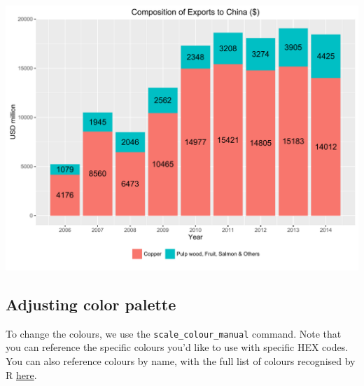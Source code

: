 \documentclass[]{article}
\newenvironment{Shaded}{\begin{snugshade}}{\end{snugshade}}
\newcommand{\KeywordTok}[1]{\textcolor[rgb]{0.13,0.29,0.53}{\textbf{{#1}}}}
\newcommand{\DataTypeTok}[1]{\textcolor[rgb]{0.13,0.29,0.53}{{#1}}}
\newcommand{\StringTok}[1]{\textcolor[rgb]{0.31,0.60,0.02}{{#1}}}
\newcommand{\NormalTok}[1]{{#1}}
\begin{document}
\begin{center}\includegraphics{0_all_posts_pdf/bar_7-1} \end{center}

\subsection{Adjusting color palette}\label{adjusting-color-palette-2}

To change the colours, we use the \texttt{scale\_colour\_manual}
command. Note that you can reference the specific colours you'd like to
use with specific HEX codes. You can also reference colours by name,
with the full list of colours recognised by R
\href{http://www.stat.columbia.edu/~tzheng/files/Rcolor.pdf}{here}.

\begin{Shaded}
\end{Shaded}
\end{document}
